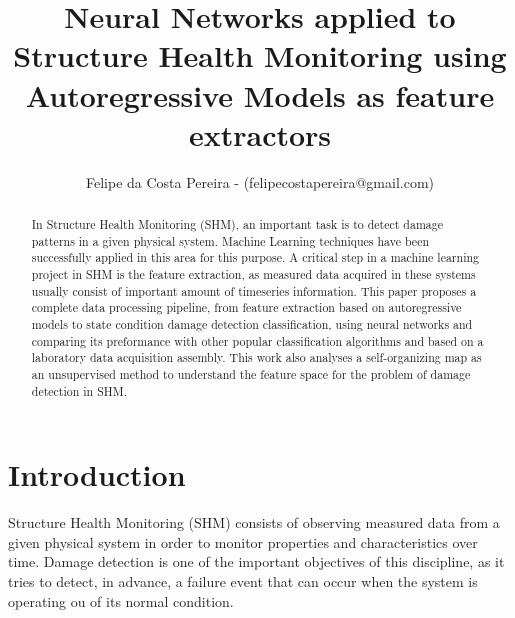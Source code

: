 \documentclass[twocolumn]{article}
\title{Neural Networks applied to Structure Health Monitoring using Autoregressive Models as feature extractors}
\author{Felipe da Costa Pereira - (felipecostapereira@gmail.com)}
\affil{PUC-RJ - ELE2389 - Redes Neurais - Trabalho Final}
\affil{Professora: Marley Vellasco}
\begin{document}
\maketitle


\begin{abstract}

In Structure Health Monitoring (SHM), an important task is to detect damage patterns in a given physical system. Machine Learning techniques have been successfully applied in this area for this purpose. A critical step in a machine learning project in SHM is the feature extraction, as measured data acquired in these systems usually consist of important amount of timeseries information. This paper proposes a complete data processing pipeline, from feature extraction based on autoregressive models to state condition damage detection classification, using neural networks and comparing its preformance with other popular classification algorithms and based on a laboratory data acquisition assembly. This work also analyses a self-organizing map as an unsupervised method to understand the feature space for the problem of damage detection in SHM.



\end{abstract}



\section{Introduction}

Structure Health Monitoring (SHM) consists of observing measured data from a given physical system in order to monitor properties and characteristics over time. Damage detection is one of the important objectives of this discipline, as it tries to detect, in advance, a failure event that can occur when the system is operating ou of its normal condition.
\end{document}
